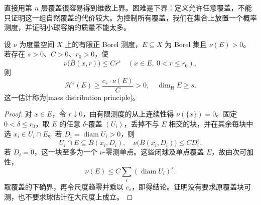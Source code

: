 直接用第 \(n\) 层覆盖很容易得到维数上界。困难是下界：定义允许任意覆盖，不能只证明这一组自然覆盖的代价较大。为控制所有覆盖，我们在集合上放置一个概率测度，并证明小球容纳的质量不能太多。

\begin{lemma}[质量分布原理]
\label{b1:lem:mass-distribution}
设 \(\nu\) 为度量空间 \(X\) 上的有限正 Borel 测度，\(E\subseteq X\) 为 Borel 集且 \(\nu(E)>0\)。若存在 \(s>0\)、\(C>0\)、\(r_0>0\)，使
\[
\nu\bigl(\overline B(x,r)\bigr)\leq Cr^s
\quad(x\in E,\ 0<r\leq r_0),
\]
则
\[
\mathcal H^s(E)\geq\frac{c_s\cdot\nu(E)}{C}>0,
\quad
\dim_{\mathrm H}E\geq s.
\]
这一估计称为[mass distribution principle]。
\end{lemma}
\begin{proof}
对 \(x\in E\)，令 \(r\downarrow0\)，由有限测度的从上连续性得 \(\nu(\{x\})=0\)。固定 \(0<\delta\leq r_0\)，取 \(E\) 的任意 \(\delta\)-覆盖 \((U_i)\)，丢掉不与 \(E\) 相交的块，并在其余每块中选 \(x_i\in U_i\cap E\)。若 \(D_i=\operatorname{diam}U_i>0\)，则
\[
U_i\cap E\subseteq\overline B(x_i,D_i),
\quad
\nu\bigl(\overline B(x_i,D_i)\bigr)\leq CD_i^s.
\]
若 \(D_i=0\)，这一块至多为一个 \(\nu\)-零测单点。这些闭球及单点覆盖 \(E\)，故由次可加性，
\[
\nu(E)\leq C\sum_i(\operatorname{diam}U_i)^s.
\]
取覆盖的下确界，再令尺度趋零并乘以 \(c_s\)，即得结论。证明没有要求原覆盖块可测，也不要求球估计在大尺度上成立。
\end{proof}

